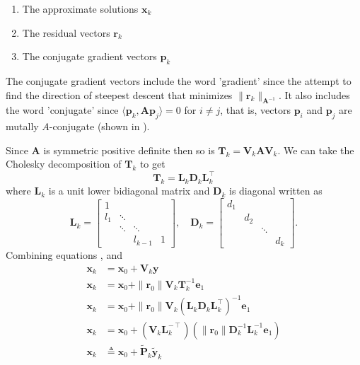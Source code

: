 \begin{enumerate}
    \item The approximate solutions $\bm{x}_{k}$
    \item The residual vectors $\bm{r}_{k}$
    \item The conjugate gradient vectors $\bm{p}_k$
\end{enumerate}
The conjugate gradient vectors include the word 'gradient' since the attempt to find the direction of steepest descent that minimizes $\| \bm{r}_{k} \|_{\bm{A}^{-1}}$. It also includes the word 'conjugate' since $\langle \bm{p}_k, \bm{A} \bm{p}_j \rangle = 0$ for $i \neq j$, that is, vectors $\bm{p}_i$ and $\bm{p}_j$ are mutally $A$-conjugate (shown in ).

Since $\bm{A}$ is symmetric positive definite then so is $\bm{T}_k  = \bm{V}_{k} \bm{A} \bm{V}_{k}$. We can take the Cholesky decomposition of $\bm{T}_k$ to get
\begin{equation} \label{eq: Tk_Cholesky}
    \bm{T}_k = \bm{L}_k \bm{D}_k \bm{L}_k^{\intercal}
\end{equation}
where $\bm{L}_k$ is a unit lower bidiagonal matrix and $\bm{D}_k$ is diagonal written as
\[
    \bm{L}_k =
    \begin{bmatrix}
        1   &        &         &   \\
        l_1 & \ddots &         &   \\
            & \ddots & \ddots  &   \\
            &        & l_{k-1} & 1
    \end{bmatrix}, \quad
    \bm{D}_k =
    \begin{bmatrix}
        d_1 &     &        &     \\
            & d_2 &        &     \\
            &     & \ddots &     \\
            &     &        & d_k
    \end{bmatrix}.
\]
Combining equations ,  and 
\begin{align*}
    \bm{x}_k & = \bm{x}_0 + \bm{V}_{k} \bm{y}                                                                                                  \\
    \bm{x}_k & = \bm{x}_0 + \| \bm{r}_0 \| \bm{V}_{k} \bm{T}_k^{-1} \bm{e}_1                                                                   \\
    \bm{x}_k & = \bm{x}_0 + \| \bm{r}_0 \| \bm{V}_{k} \left( \bm{L}_k \bm{D}_k \bm{L}_k^{\intercal} \right)^{-1} \bm{e}_1                      \\
    \bm{x}_k & = \bm{x}_0 + \left( \bm{V}_{k} \bm{L}_k^{-\intercal} \right) \left( \| \bm{r}_0 \| \bm{D}_k^{-1} \bm{L}_k^{-1} \bm{e}_1 \right) \\
    \bm{x}_k & \triangleq \bm{x}_0 + \tilde{\bm{P}}_k \tilde{\bm{y}}_k
\end{align*}

